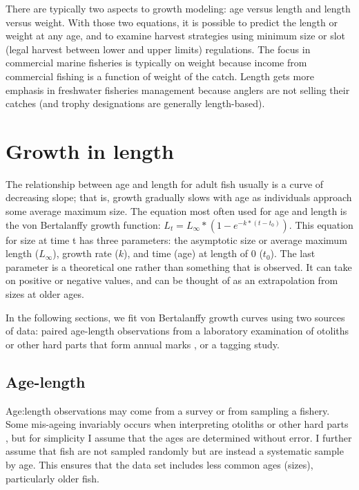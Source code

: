\documentclass[
]{krantz}
\begin{document}
There are typically two aspects to growth modeling: age versus length and length versus weight. With those two equations, it is possible to predict the length or weight at any age, and to examine harvest strategies using minimum size or slot (legal harvest between lower and upper limits) regulations. The focus in commercial marine fisheries is typically on weight because income from commercial fishing is a function of weight of the catch. Length gets more emphasis in freshwater fisheries management because anglers are not selling their catches (and trophy designations are generally length-based).

\hypertarget{vonBert}{%
\section{Growth in length}\label{vonBert}}

The relationship between age and length for adult fish usually is a curve of decreasing slope; that is, growth gradually slows with age as individuals approach some average maximum size. The equation most often used for age and length is the von Bertalanffy growth function: \(L_t=L_\infty*(1-e^{-k*(t-t_0)})\). This equation for size at time t has three parameters: the asymptotic size or average maximum length (\(L_\infty\)), growth rate (\(k\)), and time (age) at length of 0 (\(t_0\)). The last parameter is a theoretical one rather than something that is observed. It can take on positive or negative values, and can be thought of as an extrapolation from sizes at older ages.

In the following sections, we fit von Bertalanffy growth curves using two sources of data: paired age-length observations from a laboratory examination of otoliths or other hard parts that form annual marks \citep{campana2001}, or a tagging study.

\hypertarget{Otolith}{%
\subsection{Age-length}\label{Otolith}}

Age:length observations may come from a survey or from sampling a fishery. Some mis-ageing invariably occurs when interpreting otoliths or other hard parts \citep{campana2001}, but for simplicity I assume that the ages are determined without error. I further assume that fish are not sampled randomly but are instead a systematic sample by age. This ensures that the data set includes less common ages (sizes), particularly older fish.
\end{document}
